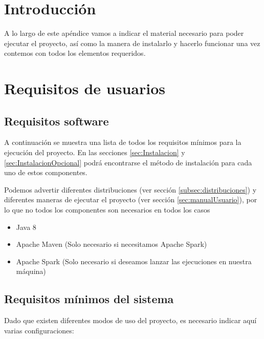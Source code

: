 
\section{Introducción}

A lo largo de este apéndice vamos a indicar el material necesario para poder ejecutar el proyecto, así como la manera de instalarlo y hacerlo funcionar una vez contemos con todos los elementos requeridos.

\section{Requisitos de usuarios}

\subsection{Requisitos software}\label{sec:ReqSoftware}

A continuación se muestra una lista de todos los requisitos mínimos para la ejecución del proyecto. En las secciones \ref{sec:Instalacion} y \ref{sec:InstalacionOpcional} podrá encontrarse el método de instalación para cada uno de estos componentes.

Podemos advertir diferentes distribuciones (ver sección \ref{subsec:distribuciones}) y diferentes maneras de ejecutar el proyecto (ver sección \ref{sec:manualUsuario}), por lo que no todos los componentes son necesarios en todos los casos

\begin{itemize}
\item Java 8
\item Apache Maven (Solo necesario si necesitamos Apache Spark)
\item Apache Spark (Solo necesario si deseamos lanzar las ejecuciones en nuestra máquina)
\end{itemize}

\subsection{Requisitos mínimos del sistema}

Dado que existen diferentes modos de uso del proyecto, es necesario indicar aquí varias configuraciones:

